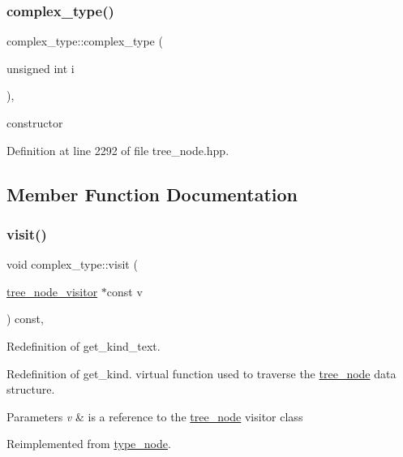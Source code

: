 \subsubsection{\texorpdfstring{complex\+\_\+type()}{complex\_type()}}
{\footnotesize\ttfamily complex\+\_\+type\+::complex\+\_\+type (\begin{DoxyParamCaption}\item[{unsigned int}]{i }\end{DoxyParamCaption})\hspace{0.3cm}{\ttfamily [inline]}, {\ttfamily [explicit]}}



constructor 



Definition at line 2292 of file tree\+\_\+node.\+hpp.



\subsection{Member Function Documentation}
\mbox{\label{structcomplex__type_a22e4557b10d89aad537a1d213bf5eafd}} 
\subsubsection{\texorpdfstring{visit()}{visit()}}
{\footnotesize\ttfamily void complex\+\_\+type\+::visit (\begin{DoxyParamCaption}\item[{\hyperlink{classtree__node__visitor}{tree\+\_\+node\+\_\+visitor} $\ast$const}]{v }\end{DoxyParamCaption}) const\hspace{0.3cm}{\ttfamily [override]}, {\ttfamily [virtual]}}



Redefinition of get\+\_\+kind\+\_\+text. 

Redefinition of get\+\_\+kind. virtual function used to traverse the \hyperlink{classtree__node}{tree\+\_\+node} data structure. 
\begin{DoxyParams}{Parameters}
{\em v} & is a reference to the \hyperlink{classtree__node}{tree\+\_\+node} visitor class \\
\hline
\end{DoxyParams}


Reimplemented from \hyperlink{structtype__node_adc6e447af5f9505e6305320933c46a96}{type\+\_\+node}.




